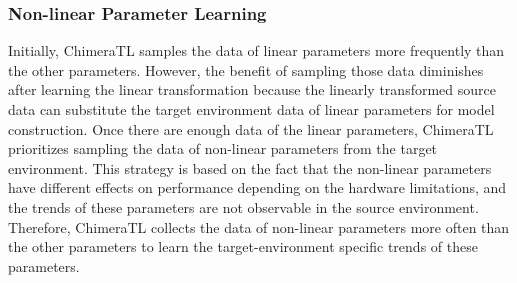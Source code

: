 \subsubsection{Non-linear Parameter Learning}
Initially, ChimeraTL samples the data of linear parameters more frequently than the other parameters.
However, the benefit of sampling those data diminishes after learning the linear transformation because the linearly transformed source data can substitute the target environment data of linear parameters for model construction.
Once there are enough data of the linear parameters, ChimeraTL prioritizes sampling the data of non-linear parameters from the target environment.
This strategy is based on the fact that the non-linear parameters have different effects on performance depending on the hardware limitations, and the trends of these parameters are not observable in the source environment.
Therefore, ChimeraTL collects the data of non-linear parameters more often than the other parameters to learn the target-environment specific trends of these parameters.

